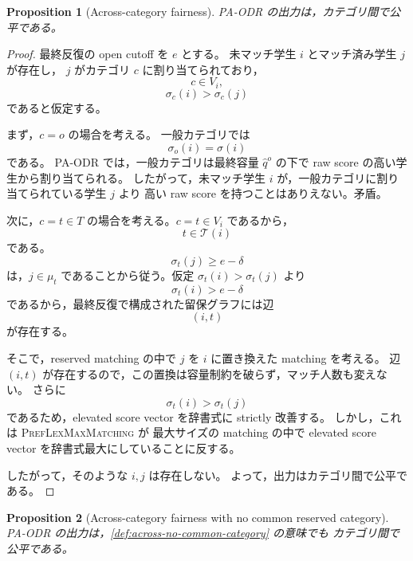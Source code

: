\documentclass[
  12pt,
  a4paper,
  oneside,
  onecolumn,
  titlepage,
  final
]{jsarticle}
\newtheorem{proposition}{Proposition}
\newcommand{\1}{\mathbf{1}}
\begin{document}
\begin{proposition}[Across-category fairness]
\label{prop:pa-odr-across}
\textsc{PA-ODR} の出力は，カテゴリ間で公平である。
\end{proposition}

\begin{proof}
最終反復の open cutoff を $e$ とする。
未マッチ学生 $i$ とマッチ済み学生 $j$ が存在し，
$j$ がカテゴリ $c$ に割り当てられており，
\[
    c\in V_i,
\]
\[
    \sigma_c(i)>\sigma_c(j)
\]
であると仮定する。

まず，$c=o$ の場合を考える。
一般カテゴリでは
\[
    \sigma_o(i)=\sigma(i)
\]
である。
\textsc{PA-ODR} では，一般カテゴリは最終容量 $\hat q^o$ の下で
raw score の高い学生から割り当てられる。
したがって，未マッチ学生 $i$ が，一般カテゴリに割り当てられている学生 $j$ より
高い raw score を持つことはありえない。矛盾。

次に，$c=t\in T$ の場合を考える。$c=t\in V_i$ であるから，
\[
    t\in\mathcal T(i)
\]
である。
\[
    \sigma_t(j)\ge e-\delta
\]
は，$j\in\mu_t$ であることから従う。仮定 $\sigma_t(i)>\sigma_t(j)$ より
\[
    \sigma_t(i)>e-\delta
\]
であるから，最終反復で構成された留保グラフには辺
\[
    (i,t)
\]
が存在する。

そこで，reserved matching の中で $j$ を $i$ に置き換えた matching を考える。
辺 $(i,t)$ が存在するので，この置換は容量制約を破らず，マッチ人数も変えない。
さらに
\[
    \sigma_t(i)>\sigma_t(j)
\]
であるため，elevated score vector を辞書式に strictly 改善する。
しかし，これは \textsc{PrefLexMaxMatching} が
最大サイズの matching の中で elevated score vector を辞書式最大にしていることに反する。

したがって，そのような $i,j$ は存在しない。
よって，出力はカテゴリ間で公平である。
\end{proof}

\begin{proposition}[Across-category fairness with no common reserved category]
\label{prop:pa-odr-across-no-common}
\textsc{PA-ODR} の出力は，\cref{def:across-no-common-category} の意味でも
カテゴリ間で公平である。
\end{proposition}
\end{document}
